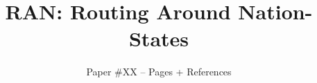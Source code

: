 \documentclass[sigconf]{acmart}
\newcommand{\system}{RAN}
\begin{document}
\date{}
\title{{
{\system{}: Routing Around Nation-States}}}
\author{
{Paper \#XX -- \pageref{lastpage} Pages + References} \\
}




\end{document}
